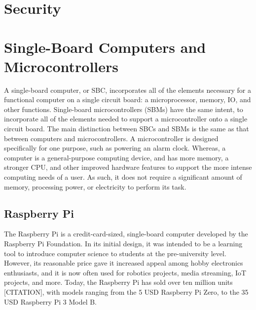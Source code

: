 \documentclass[12pt]{report}
\let\Oldsection\section
\renewcommand{\section}{\FloatBarrier\Oldsection}
\let\Oldsubsection\subsection
\renewcommand{\subsection}{\FloatBarrier\Oldsubsection}
\begin{document}

\section{Security} \label{security}



\section{Single-Board Computers and Microcontrollers} \label{single-board-computers-and-microcontrollers}

A single-board computer, or SBC, incorporates all of the elements necessary for a functional 
computer on a single circuit board: a microprocessor, memory, IO, and other functions. Single-board microcontrollers
(SBMs) have the same intent, to incorporate all of the elements needed to support a microcontroller onto a single
circuit board. The main distinction between SBCs and SBMs is the same as that between computers and microcontrollers.
A microcontroller is designed specifically for one  purpose, such as powering an alarm clock. Whereas, a
computer is a general-purpose computing device, and has more memory, a stronger CPU, and other improved hardware 
features to support the more intense computing needs of a user. As such, it does not require a significant amount of
memory, processing power, or electricity to perform its task.


\subsection{Raspberry Pi} \label{raspberry-pi}

The Raspberry Pi is a credit-card-sized, single-board computer developed by the Raspberry Pi Foundation. In its initial 
design, it was intended to be a learning tool to introduce computer science to students at the pre-university  
level. However, its reasonable price gave it increased appeal among hobby electronics enthusiasts, and it is now often 
used for robotics projects, media streaming, IoT projects, and more. Today, the Raspberry Pi has sold over ten million 
units [CITATION], with models ranging from the 5 USD Raspberry Pi Zero, to the 35 USD Raspberry Pi 3 Model B.
\end{document}
